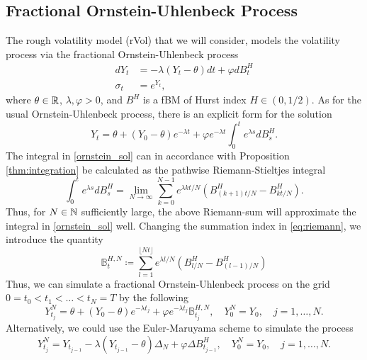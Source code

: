 \subsection{Fractional Ornstein-Uhlenbeck Process}
The rough volatility model (rVol) that we will consider, models the volatility process via the fractional Ornstein-Uhlenbeck process
\begin{align}
    dY_{t}&= -\lambda(Y_{t}-\theta)dt + \varphi dB^{H}_{t}\\
    \sigma_{t} &= e^{Y_{t}},
\end{align}
where $\theta\in \mathbb{R}$, $\lambda,\varphi >0$, and $B^{H}$ is a fBM of Hurst index $H\in(0,1/2)$. As for the usual Ornstein-Uhlenbeck process, there is an explicit form for the solution
\begin{equation}\label{ornstein_sol}
    Y_{t}= \theta + (Y_{0}-\theta)e^{-\lambda t} + \varphi e^{-\lambda t}\int_{0}^{t}e^{\lambda s}dB_{s}^{H}.
\end{equation}
The integral in \eqref{ornstein_sol} can in accordance with Proposition \ref{thm:integration} be calculated as the pathwise Riemann-Stieltjes integral
\begin{equation}\label{eq:riemann}
    \int_{0}^{t}e^{\lambda s}dB_{s}^{H}=\lim_{N\to\infty}\sum_{k=0}^{N-1}e^{\lambda k t/N}\left(B_{(k+1)t/N}^{H}-B_{kt/N}^{H}\right).
\end{equation}
Thus, for $N\in\mathbb{N}$ sufficiently large, the above Riemann-sum will approximate the integral in \eqref{ornstein_sol} well. Changing the summation index in \eqref{eq:riemann}, we introduce the quantity
\begin{equation}
    \mathbb{B}_{t}^{H,N}\coloneqq \sum_{l=1}^{\lfloor Nt\rfloor }e^{\lambda l/N}\left(B^{H}_{l/N}-B^{H}_{(l-1)/N}\right)
\end{equation}
Thus, we can simulate a fractional Ornstein-Uhlenbeck process on the grid $0=t_{0}<t_{1}<\dots<t_{N}=T$ by the following 
\begin{equation}\label{fou_exact}
    Y_{t_{j}}^{N}=\theta + (Y_{0}-\theta)e^{-\lambda t_{j}} + \varphi e^{-\lambda t_{j}}\mathbb{B}_{t_{j}}^{H,N},\quad Y_{0}^{N}=Y_{0}, \quad j=1,\dots,N.
\end{equation}
Alternatively, we could use the Euler-Maruyama scheme to simulate the process
\begin{equation}\label{fou_euler}
    Y_{t_{j}}^{N}=Y_{t_{j-1}} -\lambda(Y_{t_{j-1}}-\theta)\Delta_{N} + \varphi\Delta B_{t_{j-1}}^{H},\quad Y_{0}^{N}=Y_{0},\quad j=1,\dots,N.
\end{equation}
